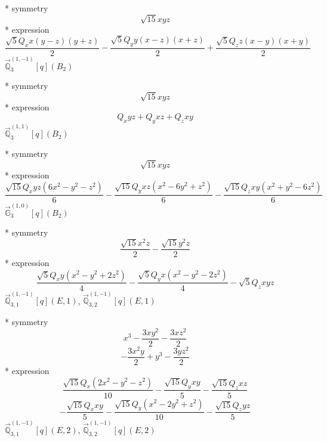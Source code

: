 \documentclass[fleqn,8pt]{jsarticle}
\begin{document}
\noindent\quad ** symmetry
\begin{dmath*}
\sqrt{15} x y z
\end{dmath*}
\noindent\quad ** expression
\begin{dmath*}
\frac{\sqrt{5} Q_{x} x \left(y - z\right) \left(y + z\right)}{2} - \frac{\sqrt{5} Q_{y} y \left(x - z\right) \left(x + z\right)}{2} + \frac{\sqrt{5} Q_{z} z \left(x - y\right) \left(x + y\right)}{2}
\end{dmath*}
\noindent\quad $\vec{\mathbb{Q}}_{3}^{(1,-1)}[q](B_{2})$

\noindent\quad ** symmetry
\begin{dmath*}
\sqrt{15} x y z
\end{dmath*}
\noindent\quad ** expression
\begin{dmath*}
Q_{x} y z + Q_{y} x z + Q_{z} x y
\end{dmath*}
\noindent\quad $\vec{\mathbb{Q}}_{3}^{(1,1)}[q](B_{2})$

\noindent\quad ** symmetry
\begin{dmath*}
\sqrt{15} x y z
\end{dmath*}
\noindent\quad ** expression
\begin{dmath*}
\frac{\sqrt{15} Q_{x} y z \left(6 x^{2} - y^{2} - z^{2}\right)}{6} - \frac{\sqrt{15} Q_{y} x z \left(x^{2} - 6 y^{2} + z^{2}\right)}{6} - \frac{\sqrt{15} Q_{z} x y \left(x^{2} + y^{2} - 6 z^{2}\right)}{6}
\end{dmath*}
\noindent\quad $\vec{\mathbb{G}}_{3}^{(1,0)}[q](B_{2})$

\noindent\quad ** symmetry
\begin{dmath*}
\frac{\sqrt{15} x^{2} z}{2} - \frac{\sqrt{15} y^{2} z}{2}
\end{dmath*}
\noindent\quad ** expression
\begin{dmath*}
\frac{\sqrt{5} Q_{x} y \left(x^{2} - y^{2} + 2 z^{2}\right)}{4} - \frac{\sqrt{5} Q_{y} x \left(x^{2} - y^{2} - 2 z^{2}\right)}{4} - \sqrt{5} Q_{z} x y z
\end{dmath*}
\noindent\quad $\vec{\mathbb{Q}}_{3,1}^{(1,-1)}[q](E,1)$, $\vec{\mathbb{Q}}_{3,2}^{(1,-1)}[q](E,1)$

\noindent\quad ** symmetry
\begin{dmath*}
x^{3} - \frac{3 x y^{2}}{2} - \frac{3 x z^{2}}{2}
\end{dmath*}
\begin{dmath*}
- \frac{3 x^{2} y}{2} + y^{3} - \frac{3 y z^{2}}{2}
\end{dmath*}
\noindent\quad ** expression
\begin{dmath*}
\frac{\sqrt{15} Q_{x} \left(2 x^{2} - y^{2} - z^{2}\right)}{10} - \frac{\sqrt{15} Q_{y} x y}{5} - \frac{\sqrt{15} Q_{z} x z}{5}
\end{dmath*}
\begin{dmath*}
- \frac{\sqrt{15} Q_{x} x y}{5} - \frac{\sqrt{15} Q_{y} \left(x^{2} - 2 y^{2} + z^{2}\right)}{10} - \frac{\sqrt{15} Q_{z} y z}{5}
\end{dmath*}
\noindent\quad $\vec{\mathbb{Q}}_{3,1}^{(1,-1)}[q](E,2)$, $\vec{\mathbb{Q}}_{3,2}^{(1,-1)}[q](E,2)$
\end{document}
